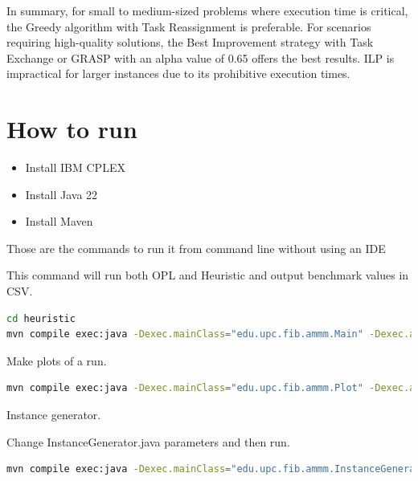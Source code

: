 \documentclass{article}
\begin{document}
In summary, for small to medium-sized problems where execution time is critical, the Greedy algorithm with Task Reassignment is preferable. For scenarios requiring high-quality solutions, the Best Improvement strategy with Task Exchange or GRASP with an alpha value of 0.65 offers the best results. ILP is impractical for larger instances due to its prohibitive execution times.


\section{How to run}

\begin{itemize}
  \item Install IBM CPLEX
  \item Install Java 22
  \item Install Maven
\end{itemize}

Those are the commands to run it from command line without using an IDE

This command will run both OPL and Heuristic and output benchmark values in CSV.

\begin{lstlisting}[language=bash]
cd heuristic
mvn compile exec:java -Dexec.mainClass="edu.upc.fib.ammm.Main" -Dexec.args="../opl"
\end{lstlisting}

Make plots of a run.

\begin{lstlisting}[language=bash]
mvn compile exec:java -Dexec.mainClass="edu.upc.fib.ammm.Plot" -Dexec.args="output.csv"
\end{lstlisting}

Instance generator.

Change InstanceGenerator.java parameters and then run.

\begin{lstlisting}[language=bash]
mvn compile exec:java -Dexec.mainClass="edu.upc.fib.ammm.InstanceGenerator"
\end{lstlisting}
\end{document}
